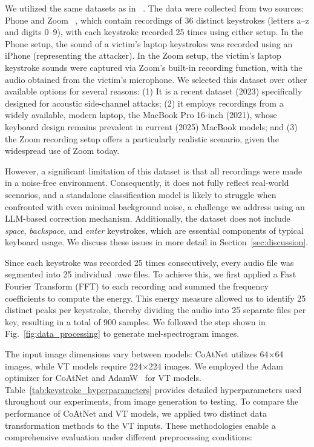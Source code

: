 We utilized the same datasets as in ~\cite{harrison2023practical}. The data were collected from two sources: Phone and Zoom ~\cite{datasetgithublink}, which contain recordings of 36 distinct keystrokes (letters a–z and digits 0–9), with each keystroke recorded 25 times using either setup. 
In the Phone setup, the sound of a victim’s laptop keystrokes was recorded using an iPhone (representing the attacker). In the Zoom setup, the victim’s laptop keystroke sounds were captured via Zoom's built-in recording function, with the audio obtained from the victim’s microphone.
We selected this dataset over other available options for several reasons: (1) It is a recent dataset (2023) specifically designed for acoustic side-channel attacks; (2) it employs recordings from a widely available, modern laptop, the MacBook Pro 16-inch (2021), whose keyboard design remains prevalent in current (2025) MacBook models; and (3) the Zoom recording setup offers a particularly realistic scenario, given the widespread use of Zoom today. 
\par 
However, a significant limitation of this dataset is that all recordings were made in a noise-free environment. Consequently, it does not fully reflect real-world scenarios, and a standalone classification model is likely to struggle when confronted with even minimal background noise, a challenge we address using an LLM-based correction mechanism. Additionally, the dataset does not include \textit{space}, \textit{backspace}, and \textit{enter} keystrokes, which are essential components of typical keyboard usage. We discuss these issues in more detail in Section~\ref{sec:discussion}.
\par 
Since each keystroke was recorded 25 times consecutively, every audio file was segmented into 25 individual \textit{.wav} files. To achieve this, we first applied a Fast Fourier Transform (FFT) to each recording and summed the frequency coefficients to compute the energy. This energy measure allowed us to identify 25 distinct peaks per keystroke, thereby dividing the audio into 25 separate files per key, resulting in a total of 900 samples. We followed the step shown in Fig.~\ref{fig:data_processing} to generate mel-spectrogram images. 
\par 
The input image dimensions vary between models: CoAtNet utilizes 64$\times$64 images, while VT models require 224$\times$224 images. We employed the Adam~\cite{kingma2014adam} optimizer for CoAtNet and AdamW~\cite{loshchilov2017decoupled} for VT models. Table~\ref{tab:keystroke_hyperparameters} provides detailed hyperparameters used throughout our experiments, from image generation to testing. To compare the performance of CoAtNet and VT models, we applied two distinct data transformation methods to the VT inputs. These methodologies enable a comprehensive evaluation under different preprocessing conditions:
